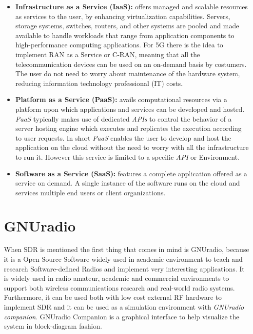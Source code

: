 \begin{itemize}

    \item \textbf{Infrastructure as a Service (IaaS):} offers managed and
    scalable resources as services to the user, by enhancing virtualization
    capabilities. Servers, storage systems, switches, routers, and other systems
    are pooled and made available to handle workloads that range from
    application components to high-performance computing applications. For 5G
    there is the idea to implement RAN as a Service or C-RAN, meaning that all
    the telecommunication devices can be used on an on-demand basis by
    costumers. The user do not need to worry about maintenance of the hardware
    system, reducing information technology professional (IT) costs.

    \item \textbf{Platform as a Service (PaaS):} avails computational resources
    via a platform upon which applications and services can be developed and
    hosted. \textit{PaaS} typically makes use of dedicated \textit{APIs} to
    control the behavior of a server hosting engine which executes and
    replicates the execution according to user requests. In short \textit{PaaS}
    enables the user to develop and host the application on the cloud without
    the need to worry with all the infrastructure to run it. However this
    service is limited to a specific \textit{API} or Environment.

    \item \textbf{Software as a Service (SaaS):} features a complete application
    offered as a service on demand. A single instance of the software runs on the
    cloud and services multiple end users or client organizations.

\end{itemize}

\section{GNUradio}
\label{sdr:gnuradio}

When SDR is mentioned the first thing that comes in mind is GNUradio, because it
is a Open Source Software widely used in academic environment to teach and
research Software-defined Radios and implement very interesting applications. It
is widely used in radio amateur, academic and commercial environments to support
both wireless communications research and real-world radio systems. Furthermore,
it can be used both with low cost external RF hardware to implement SDR and it
can be used as a simulation environment with \textit{GNUradio companion}.
GNUradio Companion is a graphical interface to help visualize the system in
block-diagram fashion.

